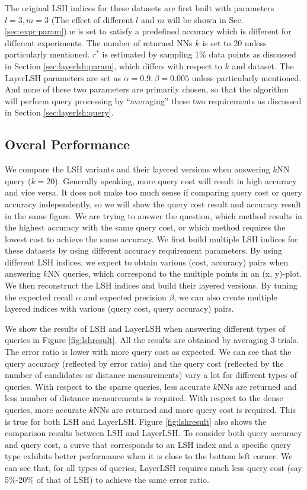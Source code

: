  The original LSH indices for these datasets are first built with parameters $l=3,m=3$ (The effect of different $l$ and $m$ will be shown in Sec. \ref{sec:expr:param}).$w$ is set to satisfy a predefined accuracy which is different for different experiments. The number of returned NNs $k$ is set to 20 unless particularly mentioned. $r^*$ is estimated by sampling 1\% data points as discussed in Section \ref{sec:layerlsh:param}, which differs with respect to $k$ and dataset. The LayerLSH parameters are set as $\alpha=0.9, \beta=0.005$ unless particularly mentioned. And none of these two parameters are primarily chosen, so that the algorithm will perform query processing by ``averaging'' these two requirements as discussed in Section \ref{sec:layerlsh:query}.

\vspace{-0.1in}
\subsection{Overal Performance}
\label{sec:expr:overall}

We compare the LSH variants and their layered versions when answering $k$NN query ($k=20$). Generally speaking, more query cost will result in high accuracy and vice versa. It does not make too much sense if comparing query cost or query accuracy independently, so we will show the query cost result and accuracy result in the same figure. We are trying to answer the question, which method results in the highest accuracy with the same query cost, or which method requires the lowest cost to achieve the same accuracy. We first build multiple LSH indices for these datasets by using different accuracy requirement parameters. By using different LSH indices, we expect to obtain various (cost, accuracy) pairs when answering $k$NN queries, which correspond to the multiple points in an (x, y)-plot. We then reconstruct the LSH indices and build their layered versions. By tuning the expected recall $\alpha$ and expected precision $\beta$, we can also create multiple layered indices with various (query cost, query accuracy) pairs.

 We show the results of LSH and LayerLSH when answering different types of queries in Figure \ref{fig:lshresult}. All the results are obtained by averaging 3 trials. The error ratio is lower with more query cost as expected. We can see that the query accuracy (reflected by error ratio) and the query cost (reflected by the number of candidates or distance measurements) vary a lot for different types of queries. With respect to the sparse queries, less accurate $k$NNs are returned and less number of distance measurements is required. With respect to the dense queries, more accurate $k$NNs are returned and more query cost is required. This is true for both LSH and LayerLSH. Figure \ref{fig:lshresult} also shows the comparison results between LSH and LayerLSH. To consider both query accuracy and query cost, a curve that corresponds to an LSH index and a specific query type exhibits better performance when it is close to the bottom left corner. We can see that, for all types of queries, LayerLSH requires much less query cost (say 5\%-20\% of that of LSH) to achieve the same error ratio.

